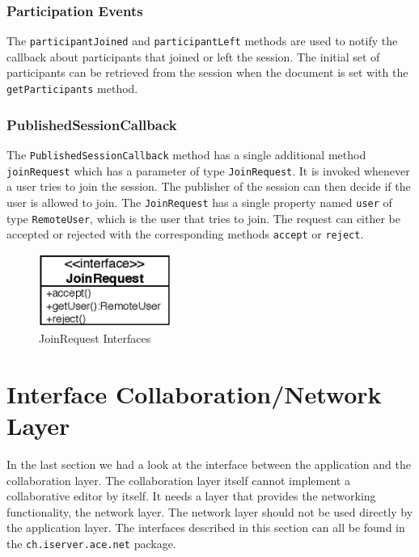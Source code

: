 \subsubsection{Participation Events}
The \texttt{participant\-Joined} and \texttt{participant\-Left} methods
are used to notify the callback about
participants that joined or left the session. The initial set of participants
can be retrieved from the session when the document is set with
the \texttt{get\-Participants} method.


\subsubsection{PublishedSessionCallback}
The \texttt{Published\-Session\-Callback} method has a single additional method
\texttt{join\-Request} which has a parameter of type \texttt{Join\-Request}. It
is invoked whenever a user tries to join the session. The publisher of the
session can then decide if the user is allowed to join. 
The \texttt{Join\-Request}
has a single property named \texttt{user} of type \texttt{Remote\-User}, 
which is the user that 
tries to join. The request can either be accepted or rejected with the 
corresponding methods \texttt{accept} or \texttt{reject}.

\begin{figure}[H]
 \centering
 \includegraphics[width=4.34cm,height=2.40cm]{../images/finalreport/architecture_joinrequest_uml.eps}
 \caption{JoinRequest Interfaces}
\end{figure}



\section{Interface Collaboration/Network Layer}
In the last section we had a look at the interface between the application and
the collaboration layer. The collaboration layer itself cannot implement a
collaborative editor by itself. It needs a layer that provides the networking
functionality, the network layer. The network layer should not be used
directly by the application layer. The interfaces described in this 
section can all be found in the \texttt{ch.\-iserver.\-ace.\-net} package.


